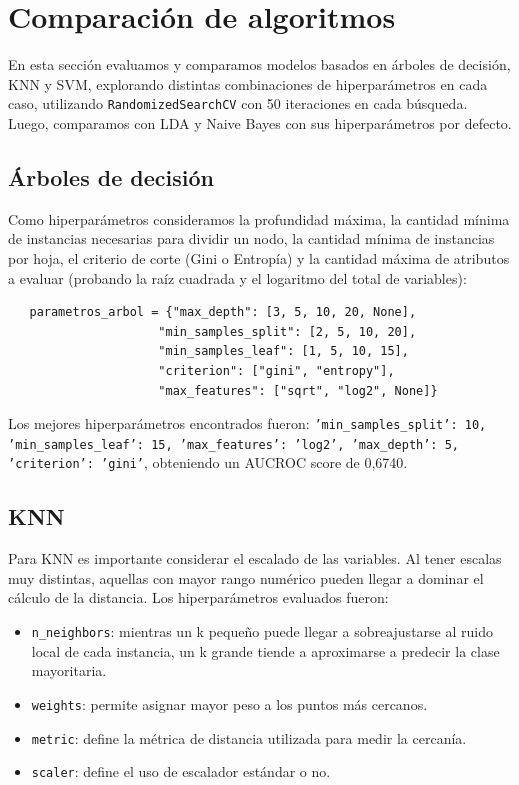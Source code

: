 \documentclass[10pt,a4paper]{article}
\begin{document}
\section{Comparación de algoritmos}
En esta sección evaluamos y comparamos modelos basados en árboles de decisión, KNN y SVM, explorando distintas combinaciones de hiperparámetros en cada caso, utilizando \texttt{RandomizedSearchCV} con 50 iteraciones en cada búsqueda. Luego, comparamos con LDA y Naive Bayes con sus hiperparámetros por defecto.

\subsection{Árboles de decisión}
Como hiperparámetros consideramos la profundidad máxima, la cantidad mínima de instancias necesarias para dividir un nodo, la cantidad mínima de instancias por hoja, el criterio de corte (Gini o Entropía) y la cantidad máxima de atributos a evaluar (probando la raíz cuadrada y el logaritmo del total de variables):

\begin{lstlisting}
   parametros_arbol = {"max_depth": [3, 5, 10, 20, None],
                     "min_samples_split": [2, 5, 10, 20], 
                     "min_samples_leaf": [1, 5, 10, 15], 
                     "criterion": ["gini", "entropy"], 
                     "max_features": ["sqrt", "log2", None]} 
\end{lstlisting}

Los mejores hiperparámetros encontrados fueron: 
\texttt{'min\_samples\_split': 10, 
'min\_samples\_leaf': 15, 
'max\_features': 'log2', 
'max\_depth': 5, 
'criterion': 'gini'}, obteniendo un AUCROC score de 0,6740.

\subsection{KNN}
Para KNN es importante considerar el escalado de las variables. Al tener escalas muy distintas, aquellas con mayor rango numérico pueden llegar a dominar el cálculo de la distancia. Los hiperparámetros evaluados fueron:

\begin{itemize}
   \item \texttt{n\_neighbors}: mientras un k pequeño puede llegar a sobreajustarse al ruido local de cada instancia, un k grande tiende a aproximarse a predecir la clase mayoritaria.
   \item \texttt{weights}: permite asignar mayor peso a los puntos más cercanos.
   \item \texttt{metric}: define la métrica de distancia utilizada para medir la cercanía.
   \item \texttt{scaler}: define el uso de escalador estándar o no.
\end{itemize}
\end{document}
